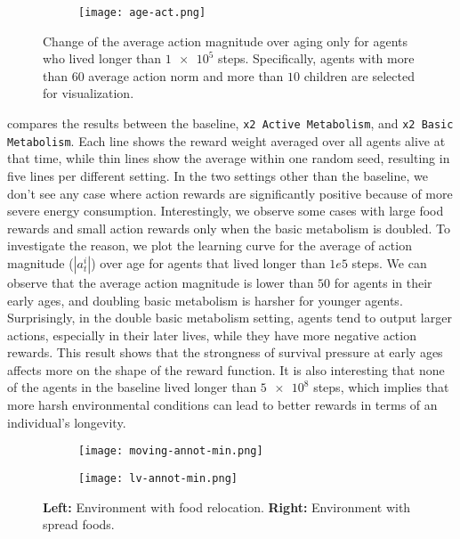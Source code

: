 \begin{figure}[t]
  \begin{subfigure}[t]{7cm}
    \centering
    \texttt{[image: age-act.png]}
  \end{subfigure}
  \caption{
    Change of the average action magnitude over aging only for agents who lived longer than $\num{1e5}$ steps.
    Specifically, agents with more than $60$ average action norm and more than $10$ children are selected for visualization.
  }\label{figure:actnorm-age}
\end{figure}

 compares the results between the baseline, \texttt{x2 Active Metabolism}, and \texttt{x2 Basic Metabolism}. Each line shows the reward weight averaged over all agents alive at that time, while thin lines show the average within one random seed, resulting in five lines per different setting. In the two settings other than the baseline, we don't see any case where action rewards are significantly positive because of more severe energy consumption. Interestingly, we observe some cases with large food rewards and small action rewards only when the basic metabolism is doubled. To investigate the reason, we plot the learning curve for the average of action magnitude ($|a_{t}^{i}|$) over age for agents that lived longer than $1e5$ steps. We can observe that the average action magnitude is lower than $50$ for agents in their early ages, and doubling basic metabolism is harsher for younger agents. Surprisingly, in the double basic metabolism setting, agents tend to output larger actions, especially in their later lives, while they have more negative action rewards. This result shows that the strongness of survival pressure at early ages affects more on the shape of the reward function. It is also interesting that none of the agents in the baseline lived longer than $\num{5e8}$ steps, which implies that more harsh environmental conditions can lead to better rewards in terms of an individual's longevity.

\begin{figure}[t]
  \begin{subfigure}[t]{4cm}
    \centering
    \texttt{[image: moving-annot-min.png]}
  \end{subfigure}
  \begin{subfigure}[t]{4cm}
    \centering
    \texttt{[image: lv-annot-min.png]}
  \end{subfigure}
  \caption{
    \textbf{Left:} Environment with food relocation.
    \textbf{Right:} Environment with spread foods.
  }\label{figure:foodloc}
\end{figure}


